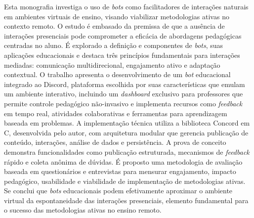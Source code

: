 \begin{resumo}

Esta monografia investiga o uso de \textit{bots} como facilitadores de
interações naturais em ambientes virtuais de ensino, visando viabilizar
metodologias ativas no contexto remoto. O estudo é embasado da premissa de que a
ausência de interações presenciais pode comprometer a eficácia de abordagens
pedagógicas centradas no aluno. É explorado a definição e componentes de
\textit{bots}, suas aplicações educacionais e destaca três princípios
fundamentais para interações mediadas: comunicação multidirecional, engajamento
ativo e adaptação contextual.  O trabalho apresenta o desenvolvimento de um
\textit{bot} educacional integrado ao Discord, plataforma escolhida por suas
características que emulam um ambiente interativo, incluindo um
\textit{dashboard} exclusivo para professores que permite controle pedagógico
não-invasivo e implementa recursos como \textit{feedback} em tempo real,
atividades colaborativas e ferramentas para aprendizagem baseada em problemas. A
implementação técnica utiliza a biblioteca Concord em C, desenvolvida pelo
autor, com arquitetura modular que gerencia publicação de conteúdo, interações,
análise de dados e persistência. A prova de conceito demonstra funcionalidades
como publicação estruturada, mecanismos de \textit{feedback} rápido e coleta
anônima de dúvidas. É proposto uma metodologia de avaliação baseada em
questionários e entrevistas para mensurar engajamento, impacto pedagógico,
usabilidade e viabilidade de implementação de metodologias ativas.  Se conclui
que \textit{bots} educacionais podem efetivamente aproximar o ambiente virtual
da espontaneidade das interações presenciais, elemento fundamental para o
sucesso das metodologias ativas no ensino remoto.

\end{resumo}
